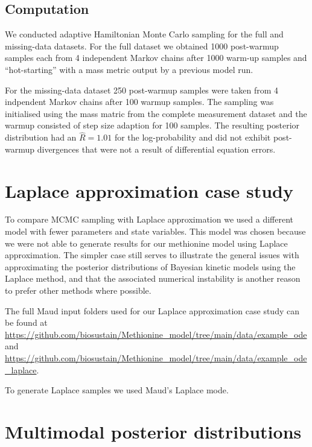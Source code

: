 \documentclass[journal=asbcd6,manuscript=article,layout=traditional]{achemso}
\begin{document}
\subsection{Computation}\label{computation}

We conducted adaptive Hamiltonian Monte Carlo sampling for the full and
missing-data datasets. For the full dataset we obtained 1000 post-warmup
samples each from 4 independent Markov chains after 1000 warm-up samples
and ``hot-starting'' with a mass metric output by a previous model run.

For the missing-data dataset 250 post-warmup samples were taken from 4
indpendent Markov chains after 100 warmup samples. The sampling was
initialised using the mass matric from the complete measurement dataset
and the warmup consisted of step size adaption for 100 samples. The
resulting posterior distribution had an \(\hat{R} = 1.01\) for the
log-probability and did not exhibit post-warmup divergences that were
not a result of differential equation errors.

\section{Laplace approximation case
study}\label{laplace-approximation-case-study}

To compare MCMC sampling with Laplace approximation we used a different
model with fewer parameters and state variables. This model was chosen
because we were not able to generate results for our methionine model
using Laplace approximation. The simpler case still serves to illustrate
the general issues with approximating the posterior distributions of
Bayesian kinetic models using the Laplace method, and that the
associated numerical instability is another reason to prefer other
methods where possible.

The full Maud input folders used for our Laplace approximation case
study can be found at
\url{https://github.com/biosustain/Methionine_model/tree/main/data/example_ode}
and
\url{https://github.com/biosustain/Methionine_model/tree/main/data/example_ode_laplace}.

To generate Laplace samples we used Maud's Laplace mode.

\section{Multimodal posterior
distributions}\label{multimodal-posterior-distributions}
\end{document}
